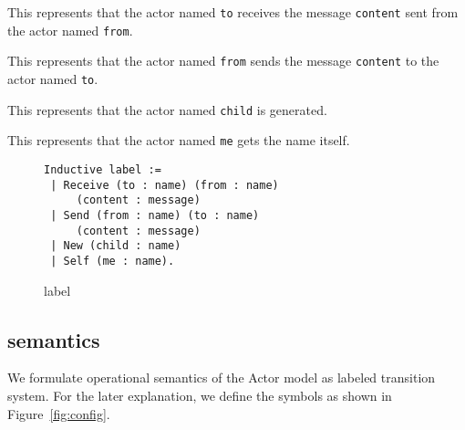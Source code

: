 
\begin{description}[style=nextline,leftmargin=12pt,parsep=0pt]
\item[\texttt{Receive (to : name) (from : name) \\ (content : message)}]
  This represents that the actor named \lstinline|to| receives the message \lstinline|content| sent from the actor named \lstinline|from|.
\item[\texttt{Send (from : name) (to : name) \\ (content : message)}]
  This represents that the actor named \lstinline|from| sends the message \lstinline|content| to the actor named \lstinline|to|.
\item[\texttt{New (child : name)}]
  This represents that the actor named \lstinline|child| is generated.
\item[\texttt{Self (me : name)}]
  This represents that the actor named \lstinline|me| gets the name itself.
\end{description}


\begin{figure}[t]
\begin{lstlisting}
Inductive label :=
 | Receive (to : name) (from : name)
     (content : message)
 | Send (from : name) (to : name)
     (content : message)
 | New (child : name)
 | Self (me : name).
\end{lstlisting}
\caption{label}\label{coq:label}
\end{figure}


\subsection{semantics}

We formulate operational semantics of the Actor model as labeled transition system.
For the later explanation, we define the symbols as shown in Figure~\ref{fig:config}.

